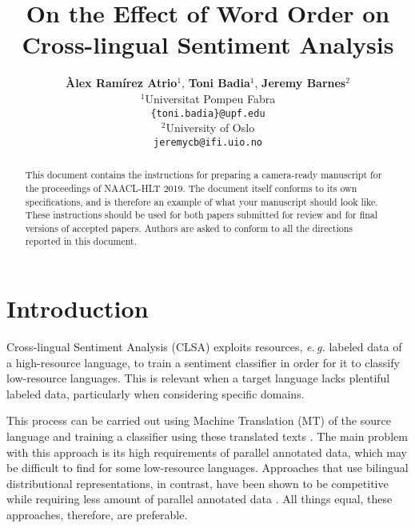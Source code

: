 \documentclass[11pt,a4paper]{article}
\title{On the Effect of Word Order on Cross-lingual Sentiment Analysis}
\author {\textbf{{\`A}lex Ramírez Atrio$^1$}, \textbf{Toni Badia$^{1}$}, \textbf{Jeremy Barnes$^{2}$}\\[5pt]
$^1$Universitat Pompeu Fabra\\
{\tt \{toni.badia\}@upf.edu} \\[5pt]
$^2$University of Oslo\\
{\tt jeremycb@ifi.uio.no}
}
\date{}
\newcommand{\eg}{\textit{e.\,g.}\xspace}
\begin{document}
\maketitle
\begin{abstract}
  This document contains the instructions for preparing a camera-ready
  manuscript for the proceedings of NAACL-HLT 2019. The document itself
  conforms to its own specifications, and is therefore an example of
  what your manuscript should look like. These instructions should be
  used for both papers submitted for review and for final versions of
  accepted papers.  Authors are asked to conform to all the directions
  reported in this document.
\end{abstract}


\section{Introduction}




Cross-lingual Sentiment Analysis (CLSA) exploits resources, \eg labeled data of a high-resource language, to train a sentiment classifier in order for it to classify low-resource languages. This is relevant when a target language lacks plentiful labeled data, particularly when considering specific domains. 

This process can be carried out using Machine Translation (MT) of the source language and training a classifier using these translated texts \cite{Banea2008,Balahur2014d}. The main problem with this approach is its high requirements of parallel annotated data, which may be difficult to find for some low-resource languages. Approaches that use bilingual distributional representations, in contrast, have been shown to be competitive while requiring less amount of parallel annotated data \cite{Chen2016,Barnes2018b}. All things equal, these approaches, therefore, are preferable.
\end{document}
